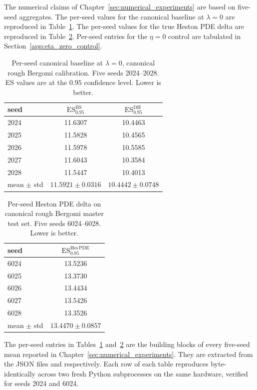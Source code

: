 \documentclass[12pt,a4paper]{article}
\theoremstyle{definition}
\theoremstyle{plain}
\theoremstyle{remark}
\theoremstyle{plain}
\begin{document}
The numerical claims of Chapter~\ref{sec:numerical_experiments} are
based on five-seed aggregates. The per-seed values for the canonical
baseline at $\lambda = 0$ are reproduced in
Table~\ref{tab:appA_baseline_per_seed}. The per-seed values for the
true Heston PDE delta are reproduced in
Table~\ref{tab:appA_heston_pde_per_seed}. Per-seed entries for the
$\eta = 0$ control are tabulated in
Section~\ref{app:eta_zero_control}.

\begin{table}[H]
\centering
\caption{Per-seed canonical baseline at $\lambda = 0$, canonical rough
Bergomi calibration. Five seeds 2024--2028. ES values are at the $0.95$
confidence level. Lower is better.}
\label{tab:appA_baseline_per_seed}
\begin{tabular}{lcc}
\toprule
seed & $\mathrm{ES}^{\mathrm{BS}}_{0.95}$ & $\mathrm{ES}^{\mathrm{DH}}_{0.95}$ \\
\midrule
2024 & 11.6307 & 10.4463 \\
2025 & 11.5828 & 10.4565 \\
2026 & 11.5978 & 10.5585 \\
2027 & 11.6043 & 10.3584 \\
2028 & 11.5447 & 10.4013 \\
\midrule
mean $\pm$ std & $11.5921 \pm 0.0316$ & $10.4442 \pm 0.0748$ \\
\bottomrule
\end{tabular}
\end{table}

\begin{table}[H]
\centering
\caption{Per-seed Heston PDE delta on canonical rough Bergomi master
test set. Five seeds 6024--6028. Lower is better.}
\label{tab:appA_heston_pde_per_seed}
\begin{tabular}{lc}
\toprule
seed & $\mathrm{ES}^{\mathrm{Hes\,PDE}}_{0.95}$ \\
\midrule
6024 & 13.5236 \\
6025 & 13.3730 \\
6026 & 13.4434 \\
6027 & 13.5426 \\
6028 & 13.3526 \\
\midrule
mean $\pm$ std & $13.4470 \pm 0.0857$ \\
\bottomrule
\end{tabular}
\end{table}

The per-seed entries in Tables~\ref{tab:appA_baseline_per_seed}
and~\ref{tab:appA_heston_pde_per_seed} are the building blocks of every
five-seed mean reported in Chapter~\ref{sec:numerical_experiments}. They
are extracted from the JSON files
 and
 respectively. Each row
of each table reproduces byte-identically across two fresh Python
subprocesses on the same hardware, verified for seeds 2024 and 6024.
\end{document}
